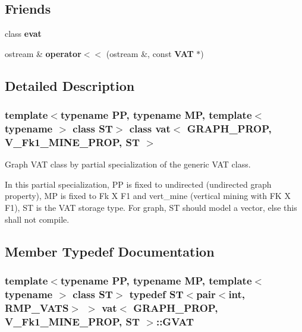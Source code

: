 \subsection*{Friends}
\begin{CompactItemize}
\item 
class {\bf evat}\label{classvat_3_01GRAPH__PROP_00_01V__Fk1__MINE__PROP_00_01ST_01_4_n0}

\item 
ostream \& {\bf operator$<$$<$} (ostream \&, const  {\bf VAT} $\ast$)\label{classvat_3_01GRAPH__PROP_00_01V__Fk1__MINE__PROP_00_01ST_01_4_n1}

\end{CompactItemize}


\subsection{Detailed Description}
\subsubsection*{template$<$typename PP, typename MP, template$<$ typename $>$ class ST$>$ class vat$<$ GRAPH\_\-PROP, V\_\-Fk1\_\-MINE\_\-PROP, ST $>$}

Graph VAT class by partial specialization of the generic VAT class. 

In this partial specialization, PP is fixed to undirected (undirected graph property), MP is fixed to Fk X F1 and vert\_\-mine (vertical mining with FK X F1), ST is the VAT storage type. For graph, ST should model a vector, else this shall not compile. 



\subsection{Member Typedef Documentation}
\subsubsection{\setlength{\rightskip}{0pt plus 5cm}template$<$typename PP, typename MP, template$<$ typename $>$ class ST$>$ typedef ST$<$pair$<$int, RMP\_\-VATS$>$ $>$ {\bf vat}$<$ GRAPH\_\-PROP, V\_\-Fk1\_\-MINE\_\-PROP, ST $>$::{\bf GVAT}}\label{classvat_3_01GRAPH__PROP_00_01V__Fk1__MINE__PROP_00_01ST_01_4_w3}


